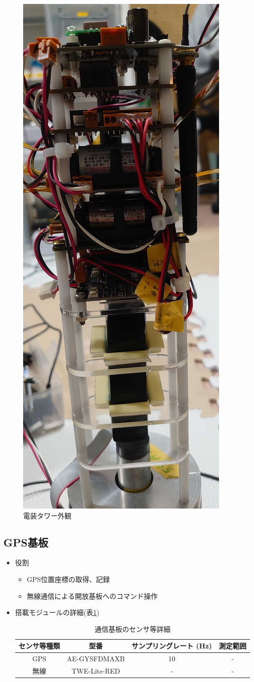 \documentclass[a4paper,11pt,titlepage,uplatex]{jsarticle}
\begin{document}
\begin{figure}[H]
	\centering
	\includegraphics[width=0.25\linewidth]{pic_avi/avi_tower.JPG}
	\caption{電装タワー外観}
	\label{fig:avi_tower}
\end{figure}

\subsection{GPS基板}
\begin{itemize}
	\item 役割
	      \begin{itemize}
		      \item GPS位置座標の取得、記録
		      \item 無線通信による開放基板へのコマンド操作
	      \end{itemize}

	\item 搭載モジュールの詳細(表\ref{tab:com_detail})
	      \begin{table}[H]
		      \centering
		      \caption{通信基板のセンサ等詳細}
		      \begin{tabular}{cccc} \toprule
			      センサ等種類 & 型番           & サンプリングレート (\si{Hz}) & 測定範囲 \\ \midrule
			      GPS    & AE-GYSFDMAXB & 10                  & -    \\
			      無線     & TWE-Lite-RED & -                   & -    \\
			      \bottomrule
		      \end{tabular}
		      \label{tab:com_detail}
	      \end{table}
\end{itemize}
\end{document}
